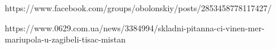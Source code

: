 https://www.facebook.com/groups/obolonskiy/posts/2853458778117427/

https://www.0629.com.ua/news/3384994/skladni-pitanna-ci-vinen-mer-mariupola-u-zagibeli-tisac-mistan








